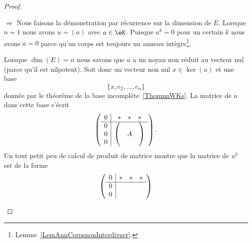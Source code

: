 \begin{proof}
	\begin{subproof}
		\item[\( \Rightarrow\)]
		Nous faisons la démonstration par récurrence sur la dimension de \( E\). Lorsque \( n=1\) nous avons \( u=(a)\) avec \( a\in \eK\). Puisque \( a^k=0\) pour un certain \( k\) nous avons \( a=0\) parce qu'un corps est toujours un anneau intègre\footnote{Lemme~\ref{LemAnnCorpsnonInterdivzer}.}.

		Lorsque \( \dim(E)=n\) nous savons que \( u\) a un noyau non réduit au vecteur nul (parce qu'il est nilpotent). Soit donc un vecteur non nul \( x\in\ker(u)\) et une base
		\begin{equation}
			\{ x,e_2,\ldots, e_n \}
		\end{equation}
		donnée par le théorème de la base incomplète~\ref{ThonmnWKs}. La matrice de \( u\) dans cette base s'écrit
		\begin{equation}
			\begin{pmatrix}
				\begin{array}[]{c|c}
					0                          & \begin{matrix}
						* & * & *
					\end{matrix} \\
					\hline
					\begin{matrix}
						0 \\
						0 \\
						0
					\end{matrix} &
					\begin{pmatrix}
						 &   & \\
						 & A & \\
						 &   &
					\end{pmatrix}
				\end{array}
			\end{pmatrix}.
		\end{equation}
		Un tout petit peu de calcul de produit de matrice montre que la matrice de \( u^k\) est de la forme
		\begin{equation}
			\begin{pmatrix}
				\begin{array}[]{c|c}
					0                          & \begin{matrix}
						* & * & *
					\end{matrix} \\
					\hline
					\begin{matrix}
						0 \\
						0 \\

\end{matrix}
\end{array}
\end{pmatrix}
\end{equation}
\end{subproof}
\end{proof}
